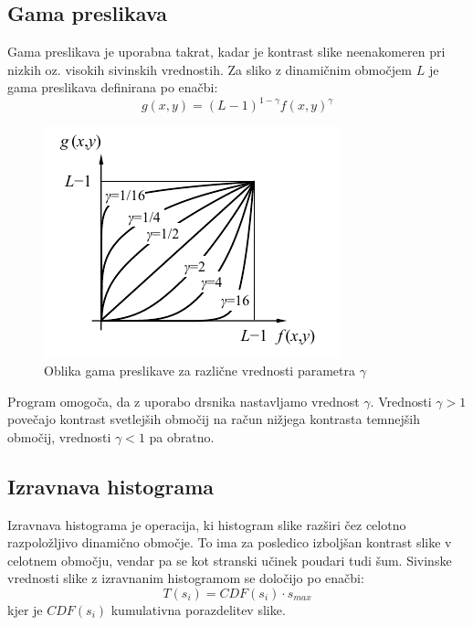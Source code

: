 \documentclass[a4paper, twocolumn]{article}
\begin{document}
\subsection{Gama preslikava}
Gama preslikava je uporabna takrat, kadar je kontrast slike neenakomeren pri nizkih oz. visokih sivinskih vrednostih. Za sliko z dinamičnim območjem $L$ je gama preslikava definirana po enačbi:
\begin{equation}
g(x,y)=(L-1)^{1-\gamma} f(x,y)^\gamma 
\end{equation}
\begin{figure}[]
	\centering
	\includegraphics[width=0.8\linewidth]{gama.png}
	\caption{Oblika gama preslikave za različne vrednosti parametra $\gamma$}
\end{figure}
Program omogoča, da z uporabo drsnika nastavljamo vrednost $\gamma$. Vrednosti $\gamma>1$ povečajo kontrast svetlejših območij na račun nižjega kontrasta temnejših območij, vrednosti $\gamma<1$ pa obratno.

\subsection{Izravnava histograma}
Izravnava histograma je operacija, ki histogram slike razširi čez celotno razpoložljivo dinamično območje. To ima za posledico izboljšan kontrast slike v celotnem območju, vendar pa se kot stranski učinek poudari tudi šum. Sivinske vrednosti slike z izravnanim histogramom se določijo po enačbi:
\begin{equation}
T(s_i)=CDF(s_i) \cdot s_{max}
\end{equation}
kjer je $CDF(s_i)$ kumulativna porazdelitev slike.
\end{document}
